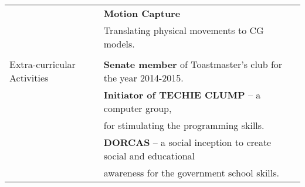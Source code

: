 \documentclass[letterpaper,11pt,oneside]{article}
\begin{document}
\begin{tabular}{@{} l l}
     &\textbf{Motion Capture}\\
     &Translating physical movements to CG models.\\
     &\\
\Large{Extra-curricular Activities} & \textbf{Senate member} of Toastmaster's club for the year 2014-2015.\\
    & \textbf{Initiator of TECHIE CLUMP} – a computer group, \\
    &for stimulating the programming skills.\\
    & \textbf{DORCAS} – a social inception to create social and educational\\
    &awareness for the government school skills.\\
\end{tabular}
\end{document}
